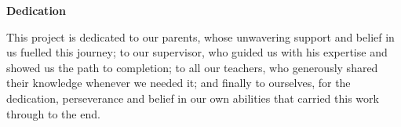 \clearpage
\thispagestyle{plain}
\begin{center}
{\fontsize{16}{20}\bfseries Dedication\par}
\end{center}
\vspace{0.3in}

This project is dedicated to our parents, whose unwavering support and belief in us
fuelled this journey; to our supervisor, who guided us with his expertise and showed us
the path to completion; to all our teachers, who generously shared their knowledge
whenever we needed it; and finally to ourselves, for the dedication, perseverance and
belief in our own abilities that carried this work through to the end.
